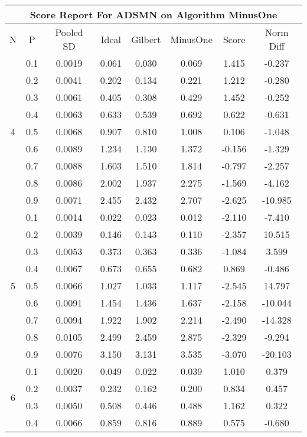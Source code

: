 \documentclass[11pt,a4paper]{report}
\begin{document}
\begin{longtable}{ | c | c || c | c | c | c | c | c | }
\hline
\multicolumn{8}{|c|}{ Score Report For ADSMN on Algorithm MinusOne} \\
\hline
N & P & Pooled SD &  Ideal &  Gilbert & MinusOne  & Score & Norm Diff \\
 \hline
 \hline
 \endhead
\multirow{9}{*}{4} & 0.1 & 0.0019 & 0.061 & 0.030 & 0.069 & 1.415 & -0.237 \\
 & 0.2 & 0.0041 & 0.202 & 0.134 & 0.221 & 1.212 & -0.280 \\
 & 0.3 & 0.0061 & 0.405 & 0.308 & 0.429 & 1.452 & -0.252 \\
 & 0.4 & 0.0063 & 0.633 & 0.539 & 0.692 & 0.622 & -0.631 \\
 & 0.5 & 0.0068 & 0.907 & 0.810 & 1.008 & 0.106 & -1.048 \\
 & 0.6 & 0.0089 & 1.234 & 1.130 & 1.372 & -0.156 & -1.329 \\
 & 0.7 & 0.0088 & 1.603 & 1.510 & 1.814 & -0.797 & -2.257 \\
 & 0.8 & 0.0086 & 2.002 & 1.937 & 2.275 & -1.569 & -4.162 \\
 & 0.9 & 0.0071 & 2.455 & 2.432 & 2.707 & -2.625 & -10.985 \\
 \hline
\multirow{9}{*}{5} & 0.1 & 0.0014 & 0.022 & 0.023 & 0.012 & -2.110 & -7.410 \\
 & 0.2 & 0.0039 & 0.146 & 0.143 & 0.110 & -2.357 & 10.515 \\
 & 0.3 & 0.0053 & 0.373 & 0.363 & 0.336 & -1.084 & 3.599 \\
 & 0.4 & 0.0067 & 0.673 & 0.655 & 0.682 & 0.869 & -0.486 \\
 & 0.5 & 0.0066 & 1.027 & 1.033 & 1.117 & -2.545 & 14.797 \\
 & 0.6 & 0.0091 & 1.454 & 1.436 & 1.637 & -2.158 & -10.044 \\
 & 0.7 & 0.0094 & 1.922 & 1.902 & 2.214 & -2.490 & -14.328 \\
 & 0.8 & 0.0105 & 2.499 & 2.459 & 2.875 & -2.329 & -9.294 \\
 & 0.9 & 0.0076 & 3.150 & 3.131 & 3.535 & -3.070 & -20.103 \\
 \hline
\multirow{9}{*}{6} & 0.1 & 0.0020 & 0.049 & 0.022 & 0.039 & 1.010 & 0.379 \\
 & 0.2 & 0.0037 & 0.232 & 0.162 & 0.200 & 0.834 & 0.457 \\
 & 0.3 & 0.0050 & 0.508 & 0.446 & 0.488 & 1.162 & 0.322 \\
 & 0.4 & 0.0066 & 0.859 & 0.816 & 0.889 & 0.575 & -0.680 \\

\end{longtable}
\end{document}
